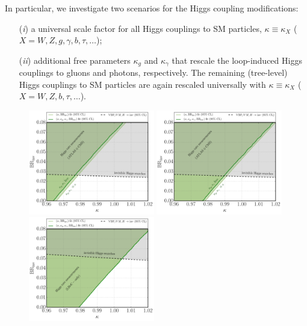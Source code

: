 \documentclass[../report.tex]{subfiles}
\begin{document}
In particular, we investigate two scenarios for the Higgs coupling modifications:
\begin{enumerate}
\item[(\emph{i})] a universal scale factor for all Higgs couplings to SM particles, $\kappa \equiv \kappa_X$ ($X = W, Z, g, \gamma, b, \tau, \dots$);
\item[(\emph{ii})] additional free parameters $\kappa_g$ and $\kappa_\gamma$ that rescale the loop-induced Higgs couplings to gluons and photons, respectively. The remaining (tree-level) Higgs couplings to SM particles are again rescaled universally with $\kappa \equiv  \kappa_X$ ($X = W, Z, b, \tau, \dots$).
\end{enumerate}

\begin{figure}
\centering
\includegraphics[width=0.49\textwidth]{section6/kappa_BR_S1}
\hfill
\includegraphics[width=0.49\textwidth]{section6/kappa_BR_S2}\\
\includegraphics[width=0.49\textwidth]{section6/kappa_BR_LHeC_BRinv0p05}

\end{figure}
\end{document}
